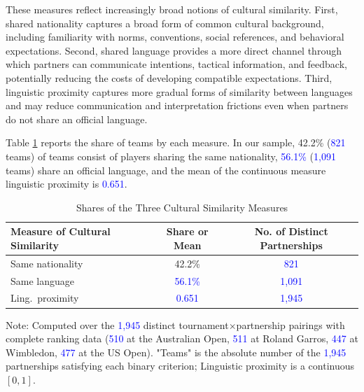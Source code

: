 \documentclass[10pt]{article}
\begin{document}
These measures reflect increasingly broad notions of cultural similarity. First, shared nationality captures a broad form of common cultural background, including familiarity with norms, conventions, social references, and behavioral expectations. Second, shared language provides a more direct channel through which partners can communicate intentions, tactical information, and feedback, potentially reducing the costs of developing compatible expectations. Third, linguistic proximity captures more gradual forms of similarity between languages and may reduce communication and interpretation frictions even when partners do not share an official language.


Table \ref{tab:t2}  reports the share of teams by each measure. In our sample, 42.2\% (\textcolor{blue}{821} teams) of teams consist of players sharing the same nationality, \textcolor{blue}{56.1\%} (\textcolor{blue}{1,091} teams) share an official language, and the mean of the continuous measure linguistic proximity is \textcolor{blue}{0.651}.


\begin{table}[htbp]

\centering
\caption{Shares of the Three Cultural Similarity Measures}
\label{tab:t2}
\begin{threeparttable}
\begin{tabular}{lcc}
\toprule
Measure of Cultural Similarity & Share or Mean & No. of Distinct Partnerships \\
\midrule
Same nationality  & 42.2\% & \textcolor{blue}{821} \\
Same language  & \textcolor{blue}{56.1\%} & \textcolor{blue}{1,091} \\
Ling.\ proximity  & \textcolor{blue}{0.651} & \textcolor{blue}{1,945} \\
\bottomrule
\end{tabular}
\begin{tablenotes}
\small
\item Note: Computed over the \textcolor{blue}{1,945} distinct tournament$\times$partnership pairings with complete ranking data (\textcolor{blue}{510} at the Australian Open, \textcolor{blue}{511} at Roland Garros, \textcolor{blue}{447} at Wimbledon, \textcolor{blue}{477} at the US Open). "Teams" is the absolute number of the \textcolor{blue}{1,945} partnerships satisfying each binary criterion; Linguistic proximity is a continuous $[0,1]$.
\end{tablenotes}
\end{threeparttable}
\end{table}
\FloatBarrier
\end{document}
